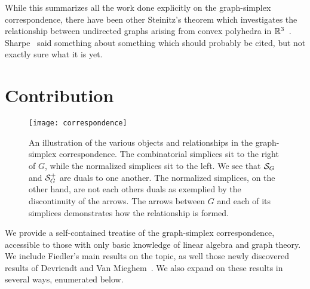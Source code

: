 While this summarizes all  the work done explicitly on the  graph-simplex correspondence, there have been  other  
Steinitz's theorem which investigates the relationship between undirected graphs arising from convex polyhedra in $\mathbb{R}^3$~\cite{steinitz1922polyeder}. 
Sharpe~\cite{sharpe1967theorem} said something about something which should probably be cited, but not exactly sure what it is yet. 


\section{Contribution}
\label{chap:intro_contribution}

\begin{figure}
	\centering 
	\texttt{[image: correspondence]}
	\caption{An illustration of the various objects and relationships in the graph-simplex correspondence. The combinatorial simplices sit to the right of $G$, while the normalized simplices sit to the left. We see that  $\mathcal{S}_G$ and $\mathcal{S}_G^+$ are duals to one another. The normalized simplices,  on the other hand, are not each others duals as exemplied by the discontinuity of the arrows. The arrows between $G$ and each of its simplices demonstrates how the relationship is formed.  }
	\label{fig:correspondence}
\end{figure}

We provide a self-contained treatise of the graph-simplex correspondence, accessible  to those with only  basic knowledge of linear algebra and  graph theory. We include Fiedler's main results  on the topic, as well those newly discovered results of Devriendt and Van Mieghem~\cite{devriendt2018simplex}. We also expand on these results in several ways,  enumerated  below. 




